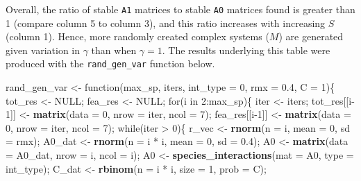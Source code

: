 \documentclass[]{article}
\newenvironment{Shaded}{\begin{snugshade}}{\end{snugshade}}
\newcommand{\KeywordTok}[1]{\textcolor[rgb]{0.13,0.29,0.53}{\textbf{{#1}}}}
\newcommand{\DataTypeTok}[1]{\textcolor[rgb]{0.13,0.29,0.53}{{#1}}}
\newcommand{\DecValTok}[1]{\textcolor[rgb]{0.00,0.00,0.81}{{#1}}}
\newcommand{\FloatTok}[1]{\textcolor[rgb]{0.00,0.00,0.81}{{#1}}}
\newcommand{\StringTok}[1]{\textcolor[rgb]{0.31,0.60,0.02}{{#1}}}
\newcommand{\OtherTok}[1]{\textcolor[rgb]{0.56,0.35,0.01}{{#1}}}
\newcommand{\NormalTok}[1]{{#1}}
\begin{document}
Overall, the ratio of stable \texttt{A1} matrices to stable \texttt{A0}
matrices found is greater than 1 (compare column 5 to column 3), and
this ratio increases with increasing \(S\) (column 1). Hence, more
randomly created complex systems (\(M\)) are generated given variation
in \(\gamma\) than when \(\gamma = 1\). The results underlying this
table were produced with the \texttt{rand\_gen\_var} function below.

\begin{Shaded}
\begin{Highlighting}[]
\NormalTok{rand_gen_var <-}\StringTok{ }\NormalTok{function(max_sp, iters, }\DataTypeTok{int_type =} \DecValTok{0}\NormalTok{, }\DataTypeTok{rmx =} \FloatTok{0.4}\NormalTok{, }\DataTypeTok{C =} \DecValTok{1}\NormalTok{)\{}
    \NormalTok{tot_res <-}\StringTok{ }\OtherTok{NULL}\NormalTok{;}
    \NormalTok{fea_res <-}\StringTok{ }\OtherTok{NULL}\NormalTok{;}
    \NormalTok{for(i in }\DecValTok{2}\NormalTok{:max_sp)\{}
        \NormalTok{iter           <-}\StringTok{ }\NormalTok{iters;}
        \NormalTok{tot_res[[i}\DecValTok{-1}\NormalTok{]] <-}\StringTok{ }\KeywordTok{matrix}\NormalTok{(}\DataTypeTok{data =} \DecValTok{0}\NormalTok{, }\DataTypeTok{nrow =} \NormalTok{iter, }\DataTypeTok{ncol =} \DecValTok{7}\NormalTok{);}
        \NormalTok{fea_res[[i}\DecValTok{-1}\NormalTok{]] <-}\StringTok{ }\KeywordTok{matrix}\NormalTok{(}\DataTypeTok{data =} \DecValTok{0}\NormalTok{, }\DataTypeTok{nrow =} \NormalTok{iter, }\DataTypeTok{ncol =} \DecValTok{7}\NormalTok{);}
        \NormalTok{while(iter >}\StringTok{ }\DecValTok{0}\NormalTok{)\{}
            \NormalTok{r_vec    <-}\StringTok{ }\KeywordTok{rnorm}\NormalTok{(}\DataTypeTok{n =} \NormalTok{i, }\DataTypeTok{mean =} \DecValTok{0}\NormalTok{, }\DataTypeTok{sd =} \NormalTok{rmx);}
            \NormalTok{A0_dat   <-}\StringTok{ }\KeywordTok{rnorm}\NormalTok{(}\DataTypeTok{n =} \NormalTok{i *}\StringTok{ }\NormalTok{i, }\DataTypeTok{mean =} \DecValTok{0}\NormalTok{, }\DataTypeTok{sd =} \FloatTok{0.4}\NormalTok{);}
            \NormalTok{A0       <-}\StringTok{ }\KeywordTok{matrix}\NormalTok{(}\DataTypeTok{data =} \NormalTok{A0_dat, }\DataTypeTok{nrow =} \NormalTok{i, }\DataTypeTok{ncol =} \NormalTok{i);}
            \NormalTok{A0       <-}\StringTok{ }\KeywordTok{species_interactions}\NormalTok{(}\DataTypeTok{mat =} \NormalTok{A0, }\DataTypeTok{type =} \NormalTok{int_type);}
            \NormalTok{C_dat    <-}\StringTok{ }\KeywordTok{rbinom}\NormalTok{(}\DataTypeTok{n =} \NormalTok{i *}\StringTok{ }\NormalTok{i, }\DataTypeTok{size =} \DecValTok{1}\NormalTok{, }\DataTypeTok{prob =} \NormalTok{C);}

\end{Highlighting}
\end{Shaded}
\end{document}
